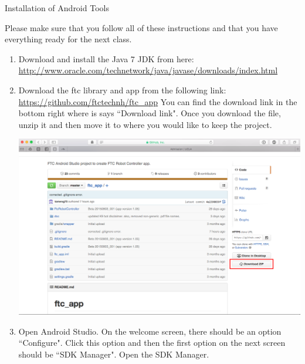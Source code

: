 \documentclass[11pt,fleqn]{article}
\theoremstyle{definition}
\begin{document}
\begin{center}
{\Huge
Installation of Android Tools
}\\
\end{center}

Please make sure that you follow all of these instructions and that you have
everything ready for the next class.

\begin{enumerate}[1.]
\item
Download and install the Java 7 JDK from here:\newline
\url{http://www.oracle.com/technetwork/java/javase/downloads/index.html}

\item
Download the ftc library and app from the following link:\newline
\url{https://github.com/ftctechnh/ftc_app}\newline
You can find the download link in the bottom right where is says ``Download
link". Once you download the file, unzip it and then move it to where you would
like to keep the project. 

\begin{center}
\includegraphics[scale=.3]{Step1}
\end{center}

\item
Open Android Studio. On the welcome screen, there should be an option
``Configure". Click this option and then the first option on the next screen
should be ``SDK Manager". Open the SDK Manager. 


\end{enumerate}
\end{document}
